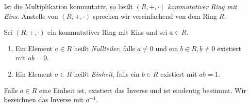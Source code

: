 \begin{bem} %
Ist die Multiplikation kommutativ, so heißt $\left(R, +, \cdot\right)$ \textit{kommutativer Ring mit Eins}. Anstelle von $\left(R, +, \cdot\right)$ sprechen wir vereinfachend von dem Ring $R$.
\end{bem}
%
\begin{defn}
Sei $\left(R, +, \cdot\right)$ ein kommutativer Ring mit Eins und sei $a \in R$.
\begin{enumerate}
\item Ein Element $a \in R$ heißt \textit{Nullteiler}, falls $a \neq 0$ und ein $b \in R, b \neq 0$ existiert mit $ab =0$.
\item Ein Element $a \in R$ heißt \textit{Einheit}, falls ein $b \in R$ existiert mit $ab = 1$. 
\end{enumerate}
\end{defn}
%
%
%
\begin{bem}
Falls $a\in R$ eine Einheit ist, existiert das Inverse und ist eindeutig bestimmt. Wir bezeichnen das Inverse mit $a^{-1}$.
\end{bem}

